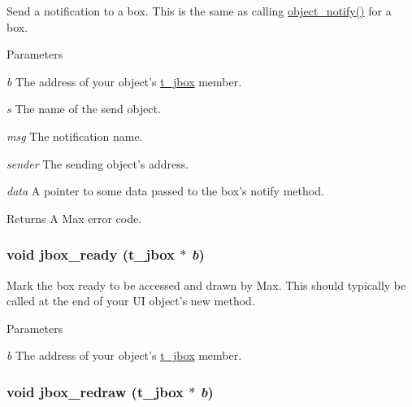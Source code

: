 Send a notification to a box. This is the same as calling \hyperlink{group__obj_ga6297b81c3a70f7fb2201c7262e96bba3}{object\_\-notify()} for a box.


\begin{DoxyParams}{Parameters}
\item[{\em b}]The address of your object's \hyperlink{structt__jbox}{t\_\-jbox} member. \item[{\em s}]The name of the send object. \item[{\em msg}]The notification name. \item[{\em sender}]The sending object's address. \item[{\em data}]A pointer to some data passed to the box's notify method. \end{DoxyParams}
\begin{DoxyReturn}{Returns}
A Max error code. 
\end{DoxyReturn}
\hypertarget{group__jbox_gabea75e4d5243003070cb2de04b81d3d1}{
\subsubsection[{jbox\_\-ready}]{\setlength{\rightskip}{0pt plus 5cm}void jbox\_\-ready ({\bf t\_\-jbox} $\ast$ {\em b})}}
\label{group__jbox_gabea75e4d5243003070cb2de04b81d3d1}


Mark the box ready to be accessed and drawn by Max. This should typically be called at the end of your UI object's new method.


\begin{DoxyParams}{Parameters}
\item[{\em b}]The address of your object's \hyperlink{structt__jbox}{t\_\-jbox} member. \end{DoxyParams}
\hypertarget{group__jbox_ga92b553f8adc9994553590bbbcfd7e49d}{
\subsubsection[{jbox\_\-redraw}]{\setlength{\rightskip}{0pt plus 5cm}void jbox\_\-redraw ({\bf t\_\-jbox} $\ast$ {\em b})}}
\label{group__jbox_ga92b553f8adc9994553590bbbcfd7e49d}


